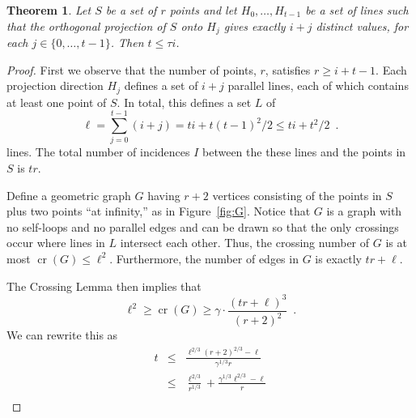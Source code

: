 \documentclass[12pt]{article}
\newtheorem{thm}{Theorem}
\DeclareMathOperator{\cn}{cr}
\begin{document}
\begin{thm}
Let $S$ be a set of $r$ points and let $H_0,\ldots,H_{t-1}$ be a
set of lines such that the orthogonal projection of $S$ onto $H_{j}$
gives exactly $i+j$ distinct values, for each $j\in\{0,\ldots,t-1\}$.
Then $t \le \tau i$.
\end{thm}

\begin{proof}
First we observe that the number of points, $r$, satisfies $r \ge i+t-1$.
Each projection direction $H_j$ defines a set of $i+j$ parallel lines,
each of which contains at least one point of $S$.  In total, this defines
a set $L$ of
\[
   \ell = \sum_{j=0}^{t-1} (i+j) = ti + t(t-1)^2/2 \le ti + t^2/2 \enspace .
\]
lines.  The total number of incidences $I$ between the these lines and
the points in $S$ is $tr$.

Define a geometric graph $G$ having $r+2$ vertices consisting
of the points in $S$ plus two points ``at infinity,'' as in
Figure~\ref{fig:G}. Notice that $G$ is a graph with no self-loops and no
parallel edges and can be drawn so that the only crossings occur where
lines in $L$ intersect each other.  Thus, the crossing number of $G$
is at most $\cn(G) \le {\ell}^{2}$.  Furthermore, the number of
edges in $G$ is exactly $tr + \ell$.

The Crossing Lemma \cite{X} then implies that
\[
    {\ell}^2 \ge \cn(G) \ge \gamma\cdot \frac{(tr+\ell)^3}{(r+2)^2} \enspace .
\]
We can rewrite this as
\begin{eqnarray*}
  t & \le & \frac{\ell^{2/3}(r+2)^{2/3} - \ell}{\gamma^{1/3}r} \\
  & \le & \frac{\ell^{2/3}}{r^{1/3}} + \frac{\gamma^{1/3}\ell^{2/3} - {\ell}}{r} \\
\end{eqnarray*}

\end{proof}
\end{document}
